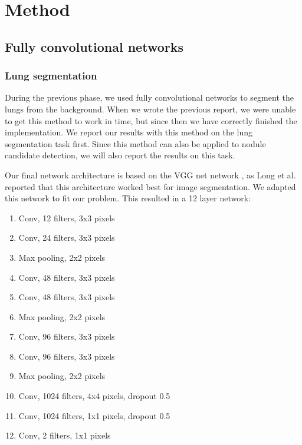 \documentclass{article}
\begin{document}
\section{Method}\label{sec:method}

\subsection{Fully convolutional networks}
\subsubsection{Lung segmentation}
During the previous phase, we used fully convolutional networks \cite{long} to segment the lungs from the background. When we wrote the previous report, we were unable to get this method to work in time, but since then we have correctly finished the implementation. We report our results with this method on the lung segmentation task first. Since this method can also be applied to nodule candidate detection, we will also report the results on this task.

Our final network architecture is based on the VGG net network \cite{simonyan}, as Long et al. \cite{long} reported that this architecture worked best for image segmentation. We adapted this network to fit our problem. This resulted in a 12 layer network:
\begin{enumerate}
    \item Conv, 12 filters, 3x3 pixels
    \item Conv, 24 filters, 3x3 pixels
    \item Max pooling, 2x2 pixels
    \item Conv, 48 filters, 3x3 pixels
    \item Conv, 48 filters, 3x3 pixels
    \item Max pooling, 2x2 pixels
    \item Conv, 96 filters, 3x3 pixels
    \item Conv, 96 filters, 3x3 pixels
    \item Max pooling, 2x2 pixels
    \item Conv, 1024 filters, 4x4 pixels, dropout 0.5
    \item Conv, 1024 filters, 1x1 pixels, dropout 0.5
    \item Conv, 2 filters, 1x1 pixels
\end{enumerate}
\end{document}
